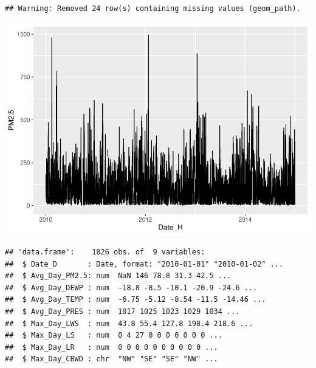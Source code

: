 \documentclass[
]{article}
\begin{document}
\begin{verbatim}
## Warning: Removed 24 row(s) containing missing values (geom_path).
\end{verbatim}

\includegraphics{Final_Project_1_files/figure-latex/unnamed-chunk-2-1.pdf}

\begin{verbatim}
## 'data.frame':    1826 obs. of  9 variables:
##  $ Date_D       : Date, format: "2010-01-01" "2010-01-02" ...
##  $ Avg_Day_PM2.5: num  NaN 146 78.8 31.3 42.5 ...
##  $ Avg_Day_DEWP : num  -18.8 -8.5 -10.1 -20.9 -24.6 ...
##  $ Avg_Day_TEMP : num  -6.75 -5.12 -8.54 -11.5 -14.46 ...
##  $ Avg_Day_PRES : num  1017 1025 1023 1029 1034 ...
##  $ Max_Day_LWS  : num  43.8 55.4 127.8 198.4 218.6 ...
##  $ Max_Day_LS   : num  0 4 27 0 0 0 0 0 0 0 ...
##  $ Max_Day_LR   : num  0 0 0 0 0 0 0 0 0 0 ...
##  $ Max_Day_CBWD : chr  "NW" "SE" "SE" "NW" ...
\end{verbatim}
\end{document}
